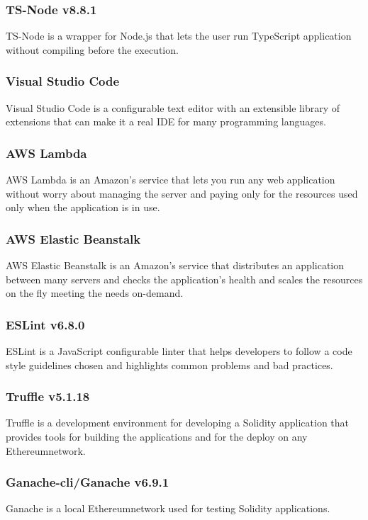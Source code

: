 \subsubsection*{TS-Node v8.8.1}
TS-Node is a wrapper for Node.js that lets the user run TypeScript application without compiling before the execution.

\subsubsection*{Visual Studio Code}
Visual Studio Code is a configurable text editor with an extensible library of extensions that can make it a real IDE for many programming languages.

\subsubsection*{AWS Lambda}
AWS Lambda is an Amazon’s service that lets you run any web application without worry about managing the server and paying only for the resources used only when the application is in use.

\subsubsection*{AWS Elastic Beanstalk}
AWS Elastic Beanstalk is an Amazon’s service that distributes an application between many servers and checks the application’s health and scales the resources on the fly meeting the needs on-demand.

\subsubsection*{ESLint v6.8.0}
ESLint is a JavaScript configurable linter that helps developers to follow a code style guidelines chosen and highlights common problems and bad practices.

\subsubsection*{Truffle v5.1.18}
Truffle is a development environment for developing a Solidity application that provides tools for building the applications and for the deploy on any Ethereum\glo network.

\subsubsection*{Ganache-cli/Ganache v6.9.1}
Ganache is a local Ethereum\glo network used for testing Solidity applications.

